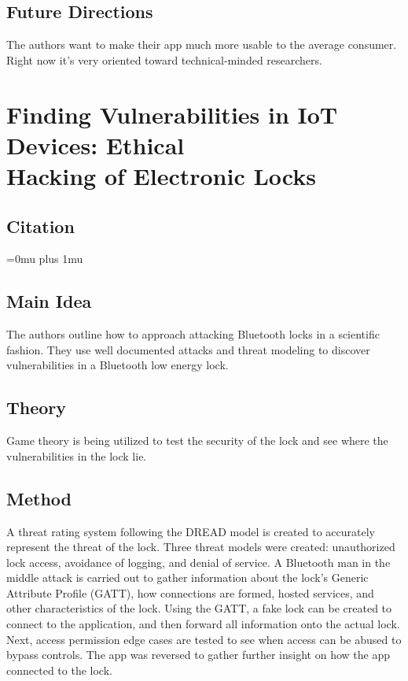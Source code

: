\documentclass[letterpaper,12pt]{article}
\begin{document}
\subsection{Future Directions}

\noindent
The authors want to make their app much more usable to the average consumer.  Right now it's very oriented toward technical-minded researchers.

\section[Finding Vulnerabilities in IoT Devices: Ethical Hacking of Electronic Locks]{Finding Vulnerabilities in IoT Devices: Ethical \\Hacking of Electronic Locks}


\noindent
\subsection{Citation}

\Urlmuskip=0mu plus 1mu\relax
{}

\subsection{Main Idea}

\noindent
The authors outline how to approach attacking Bluetooth locks in a scientific fashion. They use well documented attacks and threat modeling to discover vulnerabilities in a Bluetooth low energy lock.

\subsection{Theory}

\noindent
Game theory is being utilized to test the security of the lock and see where the vulnerabilities in the lock lie. 

\subsection{Method}

\noindent
A threat rating system following the DREAD model is created to accurately represent the threat of the lock. Three threat models were created: unauthorized lock access, avoidance of logging, and denial of service. A Bluetooth man in the middle attack is carried out to gather information about the lock’s Generic Attribute Profile (GATT), how connections are formed, hosted services, and other characteristics of the lock. Using the GATT, a fake lock can be created to connect to the application, and then forward all information onto the actual lock. Next, access permission edge cases are tested to see when access can be abused to bypass controls. The app was reversed to gather further insight on how the app connected to the lock. 
\end{document}
